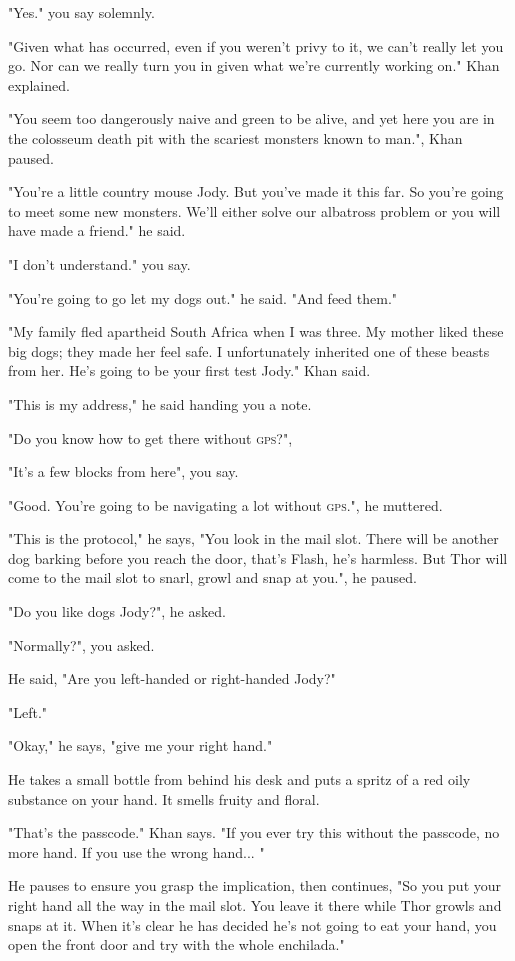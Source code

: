 \documentclass[a5paper, symmetric]{tufte-book}
\begin{document}
"Yes." you say solemnly.

"Given what has occurred, even if you weren't privy to it, we can't really let you go. Nor can we really turn you in given what we're currently working on." Khan explained. 

"You seem too dangerously naive and green to be alive, and yet here you are in the colosseum death pit with the scariest monsters known to man.", Khan paused.

"You're a little country mouse Jody. But you've made it this far. So you're going to meet some new monsters. We'll either solve our albatross problem or you will have made a friend." he said.

"I don't understand." you say. 

"You're going to go let my dogs out." he said. "And feed them."

"My family fled apartheid South Africa when I was three. My mother liked these big dogs; they made her feel safe. I unfortunately inherited one of these beasts from her. He's going to be your first test Jody." Khan said.

"This is my address," he said handing you a note.

"Do you know how to get there without \textsc{gps}?",

"It's a few blocks from here", you say.

"Good. You're going to be navigating a lot without \textsc{gps}.", he muttered.

"This is the protocol," he says, "You look in the mail slot. There will be another dog barking before you reach the door, that's Flash, he's harmless. But Thor will come to the mail slot to snarl, growl and snap at you.", he paused. 

"Do you like dogs Jody?", he asked.

"Normally?", you asked. 

He said, "Are you left-handed or right-handed Jody?"

"Left."

"Okay," he says, "give me your right hand."

He takes a small bottle from behind his desk and puts a spritz of a red oily substance on your hand. It smells fruity and floral.

"That's the passcode." Khan says. "If you ever try this without the passcode, no more hand. If you use the wrong hand... "

He pauses to ensure you grasp the implication, then continues, "So you put your right hand all the way in the mail slot. You leave it there while Thor growls and snaps at it. When it's clear he has decided he's not going to eat your hand, you open the front door and try with the whole enchilada." 
\end{document}
